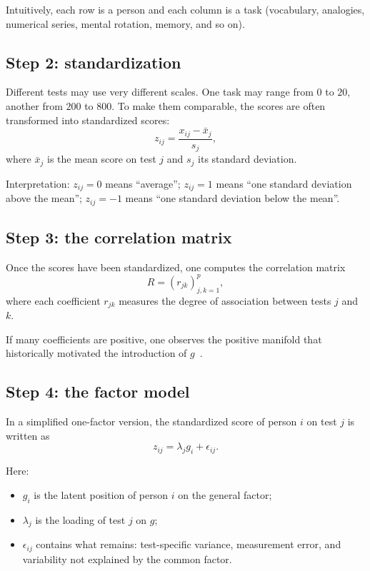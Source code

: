 \documentclass[10pt, a4paper]{article}
\theoremstyle{plain}
\theoremstyle{definition}
\theoremstyle{remark}
\begin{document}
Intuitively, each row is a person and each column is a task (vocabulary,
analogies, numerical series, mental rotation, memory, and so on).

\subsection{Step 2: standardization}

Different tests may use very different scales. One task may range from $0$ to
$20$, another from $200$ to $800$. To make them comparable, the scores are often
transformed into standardized scores:
\begin{equation}
z_{ij}=\frac{x_{ij}-\bar{x}_j}{s_j},
\label{eq:zscore}
\end{equation}
where $\bar{x}_j$ is the mean score on test $j$ and $s_j$ its standard
deviation.

Interpretation: $z_{ij}=0$ means ``average''; $z_{ij}=1$ means ``one standard
deviation above the mean''; $z_{ij}=-1$ means ``one standard deviation below the
mean''.

\subsection{Step 3: the correlation matrix}

Once the scores have been standardized, one computes the correlation matrix
\[
R=(r_{jk})_{j,k=1}^{p},
\]
where each coefficient $r_{jk}$ measures the degree of association between tests
$j$ and $k$.

If many coefficients are positive, one observes the positive manifold that
historically motivated the introduction of $g$~\cite{spearman1904}.

\subsection{Step 4: the factor model}

In a simplified one-factor version, the standardized score of person $i$ on test
$j$ is written as
\begin{equation}
z_{ij}=\lambda_j g_i + \epsilon_{ij}.
\label{eq:factor}
\end{equation}

Here:
\begin{itemize}
    \item $g_i$ is the latent position of person $i$ on the general factor;
    \item $\lambda_j$ is the loading of test $j$ on $g$;
    \item $\epsilon_{ij}$ contains what remains: test-specific variance,
          measurement error, and variability not explained by the common factor.
\end{itemize}
\end{document}
